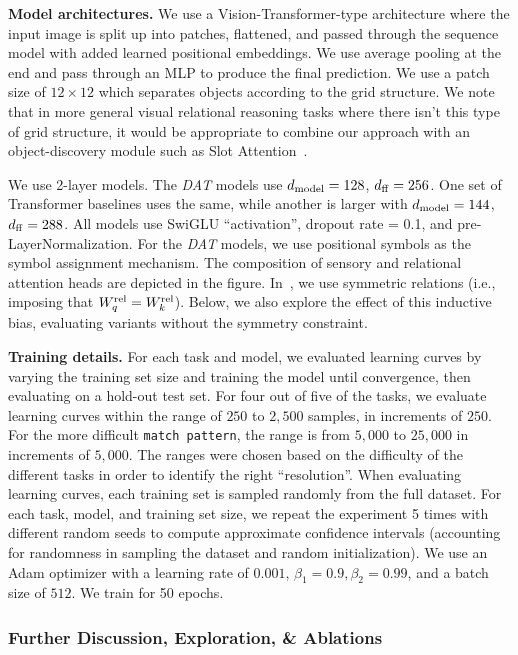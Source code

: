 \textbf{Model architectures.} We use a Vision-Transformer-type architecture where the input image is split up into patches, flattened, and passed through the sequence model with added learned positional embeddings. We use average pooling at the end and pass through an MLP to produce the final prediction. We use a patch size of $12 \times 12$ which separates objects according to the grid structure. We note that in more general visual relational reasoning tasks where there isn't this type of grid structure, it would be appropriate to combine our approach with an object-discovery module such as Slot Attention~\citep{locatelloObjectCentricLearningSlot2020}.

We use 2-layer models. The \textit{DAT} models use $d_{\mathrm{model}} = 128$, $d_{\mathrm{ff}} = 256$. One set of Transformer baselines uses the same, while another is larger with $d_{\mathrm{model}} = 144$, $d_{\mathrm{ff}} = 288$. All models use SwiGLU ``activation'', dropout rate = 0.1, and pre-LayerNormalization. For the \textit{DAT} models, we use positional symbols as the symbol assignment mechanism. The composition of sensory and relational attention heads are depicted in the figure. In~, we use symmetric relations (i.e., imposing that $W_q^{\mathrm{rel}} = W_k^{\mathrm{rel}}$). Below, we also explore the effect of this inductive bias, evaluating variants without the symmetry constraint.

\textbf{Training details.} For each task and model, we evaluated learning curves by varying the training set size and training the model until convergence, then evaluating on a hold-out test set. For four out of five of the tasks, we evaluate learning curves within the range of $250$ to $2,500$ samples, in increments of $250$. For the more difficult \texttt{match pattern}, the range is from $5,000$ to $25,000$ in increments of $5,000$. The ranges were chosen based on the difficulty of the different tasks in order to identify the right ``resolution''. When evaluating learning curves, each training set is sampled randomly from the full dataset. For each task, model, and training set size, we repeat the experiment 5 times with different random seeds to compute approximate confidence intervals (accounting for randomness in sampling the dataset and random initialization). We use an Adam optimizer with a learning rate of $0.001$, $\beta_1 = 0.9, \beta_2 = 0.99$, and a batch size of $512$. We train for 50 epochs.

\subsubsection*{Further Discussion, Exploration, \& Ablations}


